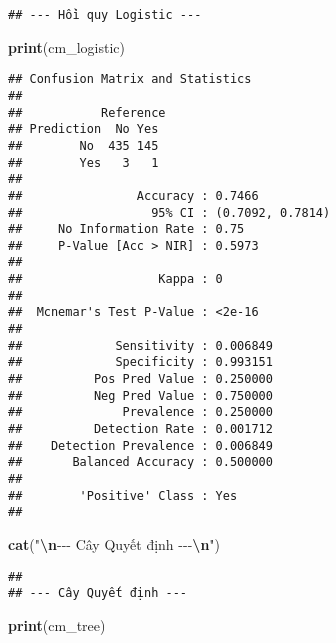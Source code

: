 \documentclass[
]{article}
\newenvironment{Shaded}{\begin{snugshade}}{\end{snugshade}}
\newcommand{\FunctionTok}[1]{\textcolor[rgb]{0.13,0.29,0.53}{\textbf{#1}}}
\newcommand{\NormalTok}[1]{#1}
\newcommand{\SpecialCharTok}[1]{\textcolor[rgb]{0.81,0.36,0.00}{\textbf{#1}}}
\newcommand{\StringTok}[1]{\textcolor[rgb]{0.31,0.60,0.02}{#1}}
\begin{document}
\begin{verbatim}
## --- Hồi quy Logistic ---
\end{verbatim}

\begin{Shaded}
\begin{Highlighting}[]
\FunctionTok{print}\NormalTok{(cm\_logistic)}
\end{Highlighting}
\end{Shaded}

\begin{verbatim}
## Confusion Matrix and Statistics
## 
##           Reference
## Prediction  No Yes
##        No  435 145
##        Yes   3   1
##                                           
##                Accuracy : 0.7466          
##                  95% CI : (0.7092, 0.7814)
##     No Information Rate : 0.75            
##     P-Value [Acc > NIR] : 0.5973          
##                                           
##                   Kappa : 0               
##                                           
##  Mcnemar's Test P-Value : <2e-16          
##                                           
##             Sensitivity : 0.006849        
##             Specificity : 0.993151        
##          Pos Pred Value : 0.250000        
##          Neg Pred Value : 0.750000        
##              Prevalence : 0.250000        
##          Detection Rate : 0.001712        
##    Detection Prevalence : 0.006849        
##       Balanced Accuracy : 0.500000        
##                                           
##        'Positive' Class : Yes             
## 
\end{verbatim}

\begin{Shaded}
\begin{Highlighting}[]
\FunctionTok{cat}\NormalTok{(}\StringTok{"}\SpecialCharTok{\textbackslash{}n}\StringTok{{-}{-}{-} Cây Quyết định {-}{-}{-}}\SpecialCharTok{\textbackslash{}n}\StringTok{"}\NormalTok{)}
\end{Highlighting}
\end{Shaded}

\begin{verbatim}
## 
## --- Cây Quyết định ---
\end{verbatim}

\begin{Shaded}
\begin{Highlighting}[]
\FunctionTok{print}\NormalTok{(cm\_tree)}
\end{Highlighting}
\end{Shaded}
\end{document}
